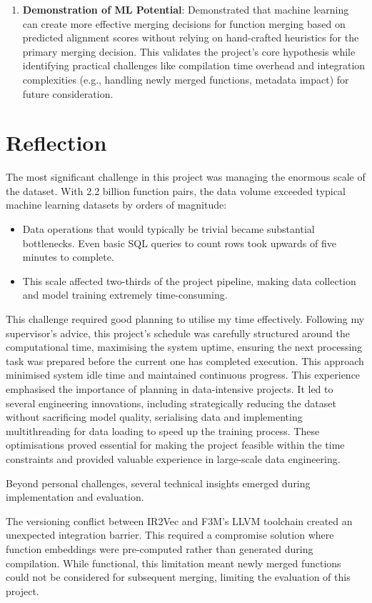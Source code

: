 \begin{enumerate}
    \item \textbf{Demonstration of ML Potential}: Demonstrated that machine learning can create more effective merging decisions for function merging based on predicted alignment scores without relying on hand-crafted heuristics for the primary merging decision. This validates the project's core hypothesis while identifying practical challenges like compilation time overhead and integration complexities (e.g., handling newly merged functions, metadata impact) for future consideration.
\end{enumerate}

\section{Reflection} \label{Conc:Reflection}
The most significant challenge in this project was managing the enormous scale of the dataset. With 2.2 billion function pairs, the data volume exceeded typical machine learning datasets by orders of magnitude:
\begin{itemize}
    \item Data operations that would typically be trivial became substantial bottlenecks. Even basic SQL queries to count rows took upwards of five minutes to complete.
    \item This scale affected two-thirds of the project pipeline, making data collection and model training extremely time-consuming.
\end{itemize}
This challenge required good planning to utilise my time effectively. Following my supervisor's advice, this project's schedule was carefully structured around the computational time, maximising the system uptime, ensuring the next processing task was prepared before the current one has completed execution. This approach minimised system idle time and maintained continuous progress. This experience emphasised the importance of planning in data-intensive projects. It led to several engineering innovations, including strategically reducing the dataset without sacrificing model quality, serialising data and implementing multithreading for data loading to speed up the training process. These optimisations proved essential for making the project feasible within the time constraints and provided valuable experience in large-scale data engineering.

Beyond personal challenges, several technical insights emerged during implementation and evaluation. 

The versioning conflict between IR2Vec and F3M's LLVM toolchain created an unexpected integration barrier. This required a compromise solution where function embeddings were pre-computed rather than generated during compilation. While functional, this limitation meant newly merged functions could not be considered for subsequent merging, limiting the evaluation of this project.

